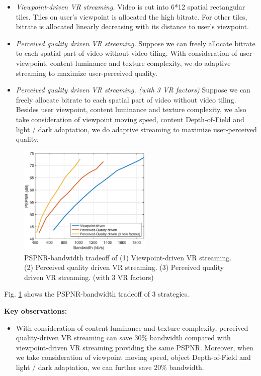 \begin{itemize}

\item \emph{Viewpoint-driven VR streaming.} Video is cut into 6*12 spatial rectangular tiles. Tiles on user's viewpoint is allocated the high bitrate. For other tiles, bitrate is allocated linearly decreasing with its distance to user's viewpoint.

\item \emph{Perceived quality driven VR streaming.} Suppose we can freely allocate bitrate to each spatial part of video without video tiling. With consideration of user viewpoint, content luminance and texture complexity, we do adaptive streaming to maximize user-perceived quality.

\item \emph{Perceived quality driven VR streaming. (with 3 VR factors)} Suppose we can freely allocate bitrate to each spatial part of video without video tiling. Besides user viewpoint, content luminance and texture complexity, we also take consideration of viewpoint moving speed, content Depth-of-Field and light / dark adaptation, we do adaptive streaming to maximize user-perceived quality.

\end{itemize}

\begin{figure}
  \centering
  \includegraphics[width=2.5in]{images/improvement.eps}
  \caption{PSPNR-bandwidth tradeoff of (1) Viewpoint-driven VR streaming. (2) Perceived quality driven VR streaming. (3) Perceived quality driven VR streaming. (with 3 VR factors)}
  \label{potential1}
  \end{figure}

Fig. \ref{potential1} shows the PSPNR-bandwidth tradeoff of 3 strategies.

\textbf{Key observations:} 
\begin{itemize}
\item With consideration of content luminance and texture complexity, perceived-quality-driven VR streaming can save 30\% bandwidth compared with viewpoint-driven VR streaming providing the same PSPNR. Moreover, when we take consideration of viewpoint moving speed, object Depth-of-Field and light / dark adaptation, we can further save 20\% bandwidth.
\end{itemize}